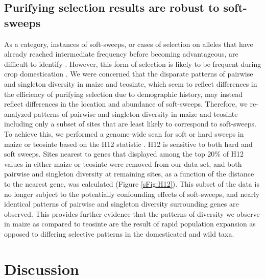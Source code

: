 \documentclass{pnastwo}
\begin{document}
\begin{article}
\subsection{Purifying selection results are robust to soft-sweeps}
As a category, instances of soft-sweeps, or cases of selection on alleles that have already reached intermediate frequency before becoming advantageous, are difficult to identify \cite{wilson2014}. However, this form of selection is likely to be frequent during crop domestication \cite{innan2004}. We were concerned that the disparate patterns of pairwise and singleton diversity in maize and teosinte, which seem to reflect differences in the efficiency of purifying selection due to demographic history, may instead reflect differences in the location and abundance of soft-sweeps. Therefore, we re-analyzed patterns of pairwise and singleton diversity in maize and teosinte including only a subset of sites that are least likely to correspond to soft-sweeps. To achieve this, we performed a genome-wide scan for soft or hard sweeps in maize or teosinte based on the H12 statistic \cite{garud2015}. H12 is sensitive to both hard and soft sweeps. Sites nearest to genes that displayed among the top 20\% of H12 values in either maize or teosinte were removed from our data set, and both pairwise and singleton diversity at remaining sites, as a function of the distance to the nearest gene, was calculated (Figure \ref{sFig:H12}). This subset of the data is no longer subject to the potentially confounding effects of soft-sweeps, and nearly identical patterns of pairwise and singleton diversity surrounding genes are observed. This provides further evidence that the patterns of diversity we observe in maize as compared to teosinte are the result of rapid population expansion as opposed to differing selective patterns in the domesticated and wild taxa.

\section{Discussion}

\end{article}
\end{document}
